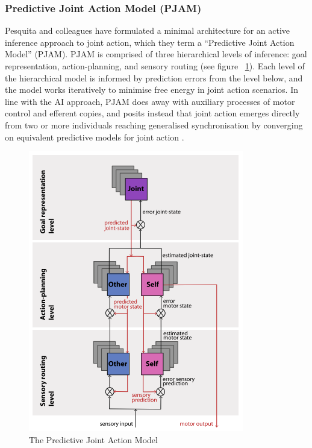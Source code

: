 \begin{CJK}{UTF8}{gbsn}
\subsubsection{Predictive Joint Action Model (PJAM)}
Pesquita and colleagues \textcite{Pesquita2017} have formulated a minimal architecture for an active inference approach to joint action, which they term a ``Predictive Joint Action Model'' (PJAM).  PJAM is comprised of three hierarchical levels of inference: goal representation, action-planning, and sensory routing (see figure ~\ref{fig:PJAM}).  Each level of the hierarchical model is informed by prediction errors from the level below, and the model works iteratively to minimise free energy in joint action scenarios.  In line with the AI approach, PJAM does away with auxiliary processes of motor control and efferent copies, and posits instead that joint action emerges directly from two or more individuals reaching generalised synchronisation by converging on equivalent predictive models for joint action \citep{Friston2015}.

\begin{figure}[htbp]
  \begin{center}
    \includegraphics[scale=.8]{images/PJAM.png}
      \caption{The Predictive Joint Action Model \citep{Pesquita2017}}
        \label{fig:PJAM}
   \end{center}
\end{figure}


\end{CJK}
